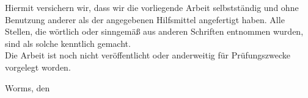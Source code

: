 
Hiermit versichern wir, dass wir die vorliegende Arbeit selbstständig und ohne Benutzung anderer als der angegebenen Hilfsmittel angefertigt haben. Alle Stellen, die wörtlich oder sinngemäß aus anderen Schriften entnommen wurden, sind als solche kenntlich gemacht.\\
Die Arbeit ist noch nicht veröffentlicht oder anderweitig für Prüfungszwecke vorgelegt worden.

\vspace{2\baselineskip}

Worms, den \einreichungsdatum